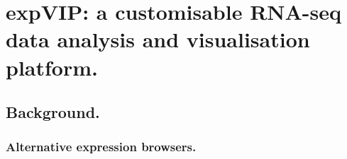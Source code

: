 
\chapter{expVIP: a customisable RNA-seq data analysis and visualisation platform.}
\label{cha:exp}
\glsresetall
{}

\section{Background.}









\subsection{Alternative expression browsers.}
\label{exp:alternative}

